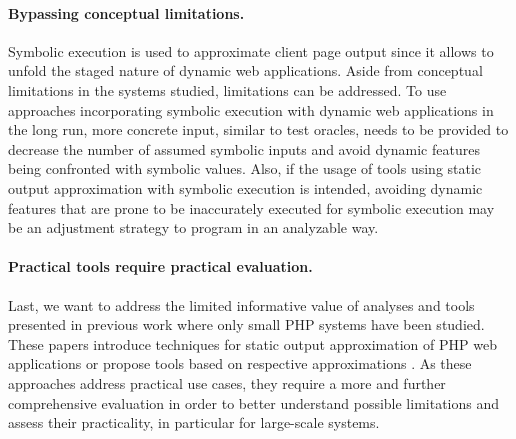 \documentclass[sigconf]{acmart}
\begin{document}
\paragraph{Bypassing conceptual limitations.}
Symbolic execution is used to approximate client page output since it allows to
unfold the staged nature of dynamic web applications. Aside from conceptual
limitations in the systems studied, limitations can be addressed. To use
approaches incorporating symbolic execution with dynamic web applications in
the long run, more concrete input, similar to test oracles, needs
to be provided to decrease the number of assumed symbolic inputs and avoid
dynamic features being confronted with symbolic values. Also, if the usage of
tools using static output approximation with symbolic execution is intended,
avoiding dynamic features that are prone to be inaccurately executed for
symbolic execution  may be an adjustment strategy to program in an analyzable
way. 

\paragraph{Practical tools require practical evaluation.}
Last, we want to address the limited informative value of analyses and tools
presented in previous work
\cite{Nguyen:2011:AFH:2190078.2190142,Nguyen:2014:BCG:2635868.2635928,Nguyen:2015:CPS:2786805.2786872,Nguyen:2015:VIS:2819009.2819140,minamide_static_2005,wassermann2007sound}
where only small PHP systems have been studied. These papers introduce
techniques for static output approximation of PHP web applications
\cite{minamide_static_2005,Nguyen:2014:BCG:2635868.2635928,wang_automating_2012} or propose tools
based on respective approximations
\cite{Nguyen:2011:AFH:2190078.2190142,Nguyen:2014:BCG:2635868.2635928,Nguyen:2015:CPS:2786805.2786872,Nguyen:2015:VIS:2819009.2819140,wassermann2007sound,wassermann_static_2008}.
As these approaches address practical use cases, they require a more and further comprehensive evaluation in order to  better understand possible limitations and assess their practicality, in particular for large-scale systems.
\end{document}
